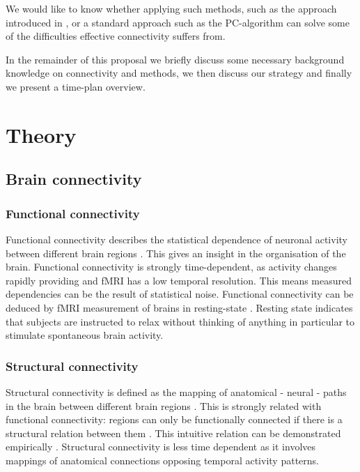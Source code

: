 \documentclass[a4paper, 10pt, english, twocolumn]{article}
\begin{document}
We would like to know whether applying such methods, such as the approach introduced in \cite{claassen2012}, or a standard approach such as the PC-algorithm \cite{spirtes2000} can solve some of the difficulties effective connectivity suffers from.

In the remainder of this proposal we briefly discuss some necessary background knowledge on connectivity and methods, we then discuss our strategy and finally we present a time-plan overview.

\section{Theory}

\subsection*{Brain connectivity}

\subsubsection*{Functional connectivity}
Functional connectivity describes the statistical dependence of neuronal activity between different brain regions \cite{friston1993functional}.
This gives an insight in the organisation of the brain.
Functional connectivity is strongly time-dependent, as activity changes rapidly providing and fMRI has a low temporal resolution.
This means measured dependencies can be the result of statistical noise.
Functional connectivity can be deduced by fMRI measurement of brains in resting-state \cite{Lowe2000, doria2010, Bullmore2009}.
Resting state indicates that subjects are instructed to relax without thinking of anything in particular to stimulate spontaneous brain activity.

\subsubsection*{Structural connectivity}
Structural connectivity is defined as the mapping of anatomical - neural - paths in the brain between different brain regions \cite{friston1994}.
This is strongly related with functional connectivity: regions can only be functionally connected if there is a structural relation between them \cite{cabral2012}.
This intuitive relation can be demonstrated empirically \cite{vandenheuvel2009}.
Structural connectivity is less time dependent as it involves mappings of anatomical connections opposing temporal activity patterns.
\end{document}
